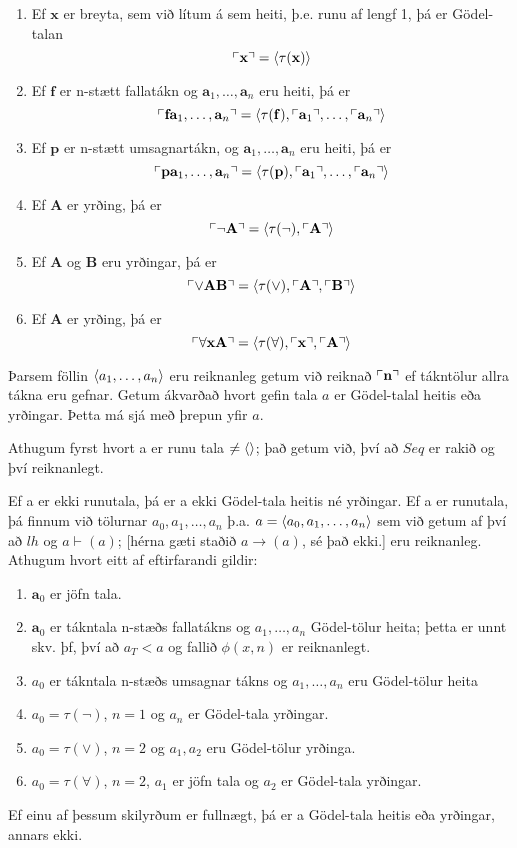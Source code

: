 \documentclass[12pt]{book}
\newcommand{\mb}[1]{\mathbf{#1}}
\newcommand{\bA}{\mathbf{A}}
\newcommand{\ba}{\mathbf{a}}
\newcommand{\bB}{\mathbf{B}}
\newcommand{\bx}{\mathbf{x}}
\newcommand{\aan}{a_1, \dotsc, a_n}
\newcommand{\baan}{\ba_1, \dotsc, \ba_n}
\DeclarePairedDelimiter{\god}{\ulcorner}{\urcorner}
\begin{document}
\begin{setn}
  \begin{enumerate}[(1)]
  \item  Ef $\bx$ er breyta, sem við lítum á sem heiti, þ.e.
    runu af lengf 1, þá er Gödel-talan
    \[ \god{\bx} =  \braket{\tau(\bx)} \]
  \item Ef $\mb{f}$ er n-stætt fallatákn og
    $\baan$ eru heiti, þá er
    \[\god{\mb{f} \baan} = \braket{\tau(\mb{f}), \god{\ba_1}, \dotsc, \god{\ba_n}}\]
  \item Ef $\mb{p}$ er n-stætt umsagnartákn, og $\baan$ eru heiti, þá er
    \[\god{\mb{p} \baan} = \braket{\tau(\mb{p}), \god{\ba_1}, \dotsc, \god{\ba_n}}\]
  \item 
    Ef $\bA$ er yrðing, þá er
    \[\god{\lnot \bA} = \braket{\tau(\lnot),\god{\bA}}\]
  \item Ef $\bA$ og $\bB$ eru yrðingar, þá er
    \[\god{\vee \bA \bB} = \braket{\tau(\vee),\god{\bA},\god{\bB}}\]
  \item 
    Ef $\bA$ er yrðing, þá er
    \[\god{\forall \bx \bA} = \braket{\tau(\forall),\god{\bx},\god{\bA}}\]
  \end{enumerate}
  Þarsem föllin $\braket{\aan}$ eru reiknanleg getum við reiknað
  $\god{\mb{n}}$ ef tákntölur allra tákna eru gefnar. Getum ákvarðað
  hvort gefin tala $a$ er Gödel-talal heitis eða yrðingar. Þetta má sjá með
  þrepun yfir $a$.
  
  Athugum fyrst hvort a er runu tala $\neq \langle\rangle$; það getum við, því að
  $Seq$ er rakið og því reiknanlegt.

  Ef a er ekki runutala, þá er a ekki Gödel-tala heitis né yrðingar.  Ef a er
  runutala, þá
  finnum við tölurnar $a_0, \aan$ þ.a. $a = \braket{a_0, \aan}$
  sem við getum af því að $lh$ og $ a \vdash (a)$; [hérna gæti staðið 
  $a \to (a)$, sé það ekki.] eru reiknanleg.
  Athugum hvort eitt af eftirfarandi gildir:
  \begin{enumerate}[(1)]
  \item  $\ba_0$ er jöfn tala.
  \item $\ba_0$ er tákntala n-stæðs fallatákns og $\aan$
    Gödel-tölur heita; þetta er unnt skv. þf, því að
    $a_T < a$ og fallið $\phi(x,n)$ er reiknanlegt.
  \item $a_0$ er tákntala n-stæðs umsagnar tákns og
    $\aan$ eru Gödel-tölur heita
  \item $a_0 = \tau(\lnot)$, $n = 1$ og $a_n$ er Gödel-tala yrðingar.
  \item $a_0 = \tau(\vee)$, $n=2$ og $a_1, a_2$ eru Gödel-tölur yrðinga.

  \item $a_0 = \tau(\forall)$, $n = 2$, $a_1$ er jöfn tala og 
    $a_2$ er Gödel-tala yrðingar.

    
  \end{enumerate}
    Ef einu af þessum skilyrðum er fullnægt, þá er a Gödel-tala heitis eða
    yrðingar, annars ekki.
\end{setn}
\end{document}
